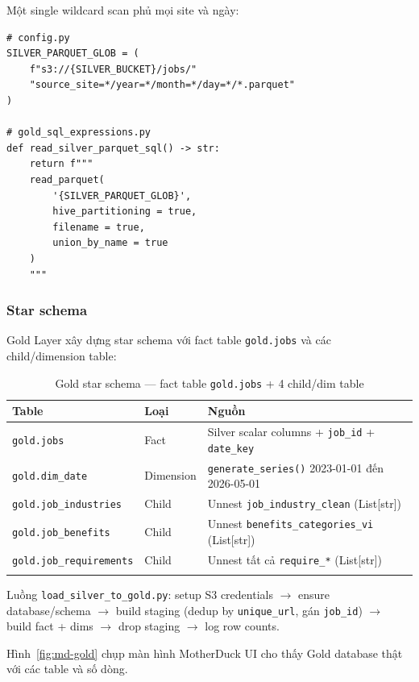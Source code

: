Một single wildcard scan phủ mọi site và ngày:

\begin{lstlisting}[caption={\texttt{src/storage\_layer/MotherDuck/config.py} + \texttt{gold\_sql\_expressions.py} --- glob và SQL đọc Silver}, label={lst:gold-glob}]
# config.py
SILVER_PARQUET_GLOB = (
    f"s3://{SILVER_BUCKET}/jobs/"
    "source_site=*/year=*/month=*/day=*/*.parquet"
)

# gold_sql_expressions.py
def read_silver_parquet_sql() -> str:
    return f"""
    read_parquet(
        '{SILVER_PARQUET_GLOB}',
        hive_partitioning = true,
        filename = true,
        union_by_name = true
    )
    """
\end{lstlisting}

\subsubsection{Star schema}
\label{subsubsec:star-schema}

Gold Layer xây dựng star schema với fact table \texttt{gold.jobs} và các
child/dimension table:

\begin{longtable}{lll}
\toprule
\textbf{Table} & \textbf{Loại} & \textbf{Nguồn} \\
\midrule
\texttt{gold.jobs} & Fact & Silver scalar columns + \texttt{job\_id} + \texttt{date\_key} \\
\texttt{gold.dim\_date} & Dimension & \texttt{generate\_series()} 2023-01-01 đến 2026-05-01 \\
\texttt{gold.job\_industries} & Child & Unnest \texttt{job\_industry\_clean} (List[str]) \\
\texttt{gold.job\_benefits} & Child & Unnest \texttt{benefits\_categories\_vi} (List[str]) \\
\texttt{gold.job\_requirements} & Child & Unnest tất cả \texttt{require\_*} (List[str]) \\
\bottomrule
\caption{Gold star schema --- fact table \texttt{gold.jobs} + 4 child/dim table}
\label{tab:gold-schema}
\end{longtable}

Luồng \texttt{load\_silver\_to\_gold.py}: setup S3 credentials $\rightarrow$
ensure database/schema $\rightarrow$ build staging (dedup by
\texttt{unique\_url}, gán \texttt{job\_id}) $\rightarrow$ build fact + dims
$\rightarrow$ drop staging $\rightarrow$ log row counts.

Hình~\ref{fig:md-gold} chụp màn hình MotherDuck UI cho thấy Gold database thật với các table
và số dòng.

